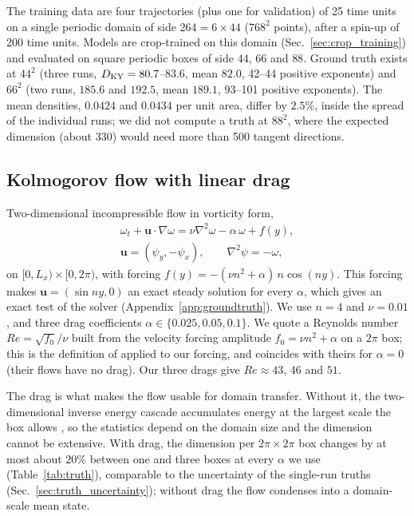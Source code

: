 The training data are four trajectories (plus one for validation) of
25 time units on a single periodic domain of side $264=6\times44$
($768^2$ points), after a spin-up of 200 time units. Models are crop-trained
on this domain (Sec.~\ref{sec:crop_training}) and evaluated on square
periodic boxes of side $44$, $66$ and $88$. Ground truth exists at $44^2$
(three runs, $D_{\mathrm{KY}}=80.7$--$83.6$, mean $82.0$, 42--44 positive exponents)
and $66^2$ (two runs, $185.6$ and $192.5$, mean $189.1$, 93--101 positive
exponents). The mean densities, $0.0424$ and $0.0434$ per unit area,
differ by $2.5\%$, inside the spread of the individual runs; we did not
compute a truth at $88^2$, where the expected dimension (about 330) would
need more than 500 tangent directions.

\subsection{Kolmogorov flow with linear drag}
\label{sec:kolmogorov}

Two-dimensional incompressible flow in vorticity form,
\begin{equation}
\begin{gathered}
  \omega_t + \bm u\cdot\nabla\omega = \nu\nabla^2\omega - \alpha\,\omega + f(y),\\
  \bm u = (\psi_y,-\psi_x),\qquad \nabla^2\psi=-\omega,
\end{gathered}
  \label{eq:kolmogorov}
\end{equation}
on $[0,L_x)\times[0,2\pi)$, with forcing
$f(y) = -(\nu n^2+\alpha)\,n\cos(ny)$. This forcing makes
$\bm u = (\sin ny, 0)$ an exact steady solution for every $\alpha$, which
gives an exact test of the solver (Appendix~\ref{app:groundtruth}).
We use $n=4$ and $\nu=0.01$, and three drag coefficients
$\alpha\in\{0.025,0.05,0.1\}$. We quote a Reynolds number
$Re=\sqrt{f_0}/\nu$ built from the velocity forcing amplitude
$f_0=\nu n^2+\alpha$ on a $2\pi$ box; this is the definition of
\citet{kolmogorovregimes2026} applied to our forcing, and coincides with
theirs for $\alpha=0$ (their flows have no drag). Our three drags give
$Re\approx43$, $46$ and $51$.

The drag is what makes the flow usable for domain transfer. Without it,
the two-dimensional inverse energy cascade accumulates energy at the
largest scale the box allows
\citep{kraichnan1967,smithyakhot1993,boffettaecke2012}, so the
statistics depend on the domain size and the dimension cannot be
extensive. With drag, the dimension per $2\pi\times2\pi$ box changes
by at most about $20\%$ between one and three boxes at every $\alpha$ we
use (Table~\ref{tab:truth}), comparable to the uncertainty of the
single-run truths (Sec.~\ref{sec:truth_uncertainty}); without drag the
flow condenses into a domain-scale mean state.

